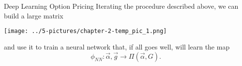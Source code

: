 \documentclass[11pt]{beamer}
\begin{document}
\begin{frame}{Deep Learning Option Pricing}
Iterating the procedure described above, we can build a large matrix 
		\begin{center}
	\texttt{[image: ../5-pictures/chapter-2-temp\_pic\_1.png]}
		\end{center}
and use it to train a neural network that, if all goes well, will learn the map
\begin{equation}
    \phi_{NN}: \vec{\alpha}, \vec{g} \rightarrow \Pi(\vec{\alpha}, G).
\end{equation}     
\end{frame}
\end{document}
